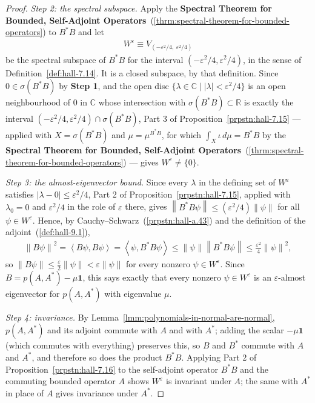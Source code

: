 \begin{proof}
\textit{Step 2: the spectral subspace.} Apply the \textbf{Spectral Theorem for Bounded, Self-Adjoint Operators}~(\ref{thrm:spectral-theorem-for-bounded-operators}) to $B^*B$ and let
\begin{align}
    W^\varepsilon \equiv V_{(-\varepsilon^2/4,\ \varepsilon^2/4)}
\end{align}
be the spectral subspace of $B^*B$ for the interval $(-\varepsilon^2/4, \varepsilon^2/4)$, in the sense of Definition~\ref{def:hall-7.14}. It is a closed subspace, by that definition. Since $0 \in \sigma(B^*B)$ by \textbf{Step 1}, and the open disc $\{ \lambda \in \mathbb{C} \mid \lvert \lambda \rvert < \varepsilon^2/4 \}$ is an open neighbourhood of $0$ in $\mathbb{C}$ whose intersection with $\sigma(B^*B) \subset \mathbb{R}$ is exactly the interval $(-\varepsilon^2/4,\varepsilon^2/4) \cap \sigma(B^*B)$, Part 3 of Proposition~\ref{prpstn:hall-7.15} — applied with $X = \sigma(B^*B)$ and $\mu = \mu^{B^*B}$, for which $\int_X \iota\,d\mu = B^*B$ by the \textbf{Spectral Theorem for Bounded, Self-Adjoint Operators}~(\ref{thrm:spectral-theorem-for-bounded-operators}) — gives $W^\varepsilon \ne \{0\}$.

\textit{Step 3: the almost-eigenvector bound.} Since every $\lambda$ in the defining set of $W^\varepsilon$ satisfies $\lvert \lambda - 0 \rvert \le \varepsilon^2/4$, Part 2 of Proposition~\ref{prpstn:hall-7.15}, applied with $\lambda_0 = 0$ and $\varepsilon^2/4$ in the role of $\varepsilon$ there, gives $\left\| B^*B\psi \right\| \le (\varepsilon^2/4)\left\| \psi \right\|$ for all $\psi \in W^\varepsilon$. Hence, by Cauchy–Schwarz~(\ref{prpstn:hall-a.43}) and the definition of the adjoint~(\ref{def:hall-9.1}),
\begin{align}
    \left\| B\psi \right\|^2 = \left< B\psi, B\psi \right> = \left< \psi, B^*B\psi \right> \le \left\| \psi \right\| \left\| B^*B\psi \right\| \le \frac{\varepsilon^2}{4}\left\| \psi \right\|^2,
\end{align}
so $\left\| B\psi \right\| \le \tfrac{\varepsilon}{2}\left\| \psi \right\| < \varepsilon\left\| \psi \right\|$ for every nonzero $\psi \in W^\varepsilon$. Since $B = p(A,A^*) - \mu\mathbf{1}$, this says exactly that every nonzero $\psi \in W^\varepsilon$ is an $\varepsilon$-almost eigenvector for $p(A,A^*)$ with eigenvalue $\mu$.

\textit{Step 4: invariance.} By Lemma~\ref{lmm:polynomials-in-normal-are-normal}, $p(A,A^*)$ and its adjoint commute with $A$ and with $A^*$; adding the scalar $-\mu\mathbf{1}$ (which commutes with everything) preserves this, so $B$ and $B^*$ commute with $A$ and $A^*$, and therefore so does the product $B^*B$. Applying Part 2 of Proposition~\ref{prpstn:hall-7.16} to the self-adjoint operator $B^*B$ and the commuting bounded operator $A$ shows $W^\varepsilon$ is invariant under $A$; the same with $A^*$ in place of $A$ gives invariance under $A^*$.
\end{proof}

